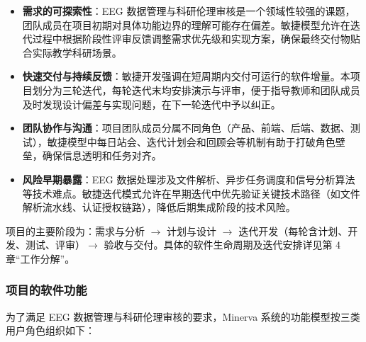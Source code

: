 \begin{itemize}
  \item \textbf{需求的可探索性}：EEG 数据管理与科研伦理审核是一个领域性较强的课题，团队成员在项目初期对具体功能边界的理解可能存在偏差。敏捷模型允许在迭代过程中根据阶段性评审反馈调整需求优先级和实现方案，确保最终交付物贴合实际教学科研场景。
  \item \textbf{快速交付与持续反馈}：敏捷开发强调在短周期内交付可运行的软件增量。本项目划分为三轮迭代，每轮迭代末均安排演示与评审，便于指导教师和团队成员及时发现设计偏差与实现问题，在下一轮迭代中予以纠正。
  \item \textbf{团队协作与沟通}：项目团队成员分属不同角色（产品、前端、后端、数据、测试），敏捷模型中每日站会、迭代计划会和回顾会等机制有助于打破角色壁垒，确保信息透明和任务对齐。
  \item \textbf{风险早期暴露}：EEG 数据处理涉及文件解析、异步任务调度和信号分析算法等技术难点。敏捷迭代模式允许在早期迭代中优先验证关键技术路径（如文件解析流水线、认证授权链路），降低后期集成阶段的技术风险。
\end{itemize}

项目的主要阶段为：需求与分析 $\to$ 计划与设计 $\to$ 迭代开发（每轮含计划、开发、测试、评审）$\to$ 验收与交付。具体的软件生命周期及迭代安排详见第 4 章“工作分解”。

\subsubsection{项目的软件功能}

为了满足 EEG 数据管理与科研伦理审核的要求，Minerva 系统的功能模型按三类用户角色组织如下：

